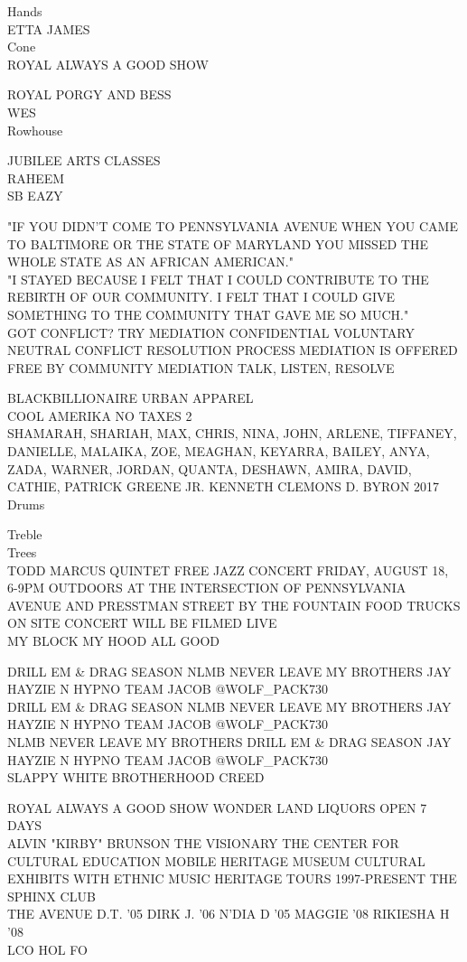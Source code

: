 \documentclass[10pt,letterpaper]{article}
\begin{document}
Hands\\
ETTA JAMES\\
Cone\\
ROYAL ALWAYS A GOOD SHOW

ROYAL PORGY AND BESS\\
WES\\
Rowhouse

JUBILEE ARTS CLASSES\\
RAHEEM\\
SB EAZY

"IF YOU DIDN'T COME TO PENNSYLVANIA AVENUE WHEN YOU CAME TO BALTIMORE OR THE STATE OF MARYLAND YOU MISSED THE WHOLE STATE AS AN AFRICAN AMERICAN."\\
"I STAYED BECAUSE I FELT THAT I COULD CONTRIBUTE TO THE REBIRTH OF OUR COMMUNITY.  I FELT THAT I COULD GIVE SOMETHING TO THE COMMUNITY THAT GAVE ME SO MUCH."\\
GOT CONFLICT?  TRY MEDIATION CONFIDENTIAL VOLUNTARY NEUTRAL CONFLICT RESOLUTION PROCESS MEDIATION IS OFFERED FREE BY COMMUNITY MEDIATION TALK, LISTEN, RESOLVE

BLACKBILLIONAIRE URBAN APPAREL\\
COOL AMERIKA NO TAXES 2\\
SHAMARAH, SHARIAH, MAX, CHRIS, NINA, JOHN, ARLENE, TIFFANEY, DANIELLE, MALAIKA, ZOE, MEAGHAN, KEYARRA, BAILEY, ANYA, ZADA, WARNER, JORDAN, QUANTA, DESHAWN, AMIRA, DAVID, CATHIE, PATRICK GREENE JR. KENNETH CLEMONS D. BYRON 2017\\
Drums

Treble\\
Trees\\
TODD MARCUS QUINTET FREE JAZZ CONCERT FRIDAY, AUGUST 18, 6{-}9PM OUTDOORS AT THE INTERSECTION OF PENNSYLVANIA AVENUE AND PRESSTMAN STREET BY THE FOUNTAIN FOOD TRUCKS ON SITE CONCERT WILL BE FILMED LIVE\\
MY BLOCK MY HOOD ALL GOOD

DRILL EM \& DRAG SEASON NLMB NEVER LEAVE MY BROTHERS JAY HAYZIE N HYPNO TEAM JACOB @WOLF\_PACK730\\
DRILL EM \& DRAG SEASON NLMB NEVER LEAVE MY BROTHERS JAY HAYZIE N HYPNO TEAM JACOB @WOLF\_PACK730\\
NLMB NEVER LEAVE MY BROTHERS DRILL EM \& DRAG SEASON JAY HAYZIE N HYPNO TEAM JACOB @WOLF\_PACK730\\
SLAPPY  WHITE BROTHERHOOD CREED

ROYAL ALWAYS A GOOD SHOW WONDER LAND LIQUORS OPEN 7 DAYS\\
ALVIN "KIRBY" BRUNSON THE VISIONARY THE CENTER FOR CULTURAL EDUCATION MOBILE HERITAGE MUSEUM CULTURAL EXHIBITS WITH ETHNIC MUSIC HERITAGE TOURS 1997{-}PRESENT THE SPHINX CLUB\\
THE AVENUE D.T. '05 DIRK J. '06 N'DIA D '05 MAGGIE '08 RIKIESHA H '08\\
LCO HOL FO
\end{document}
